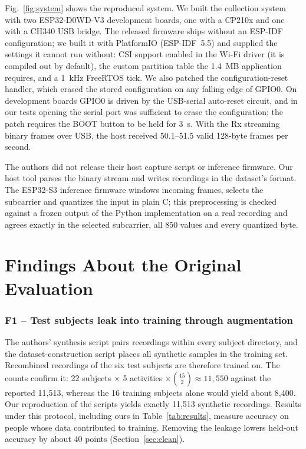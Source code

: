 \documentclass[journal]{IEEEtran}
\begin{document}
Fig.~\ref{fig:system} shows the reproduced system. We built the collection system with
two ESP32-D0WD-V3 development boards, one with a
CP210x and one with a CH340 USB bridge. The released firmware ships without an
ESP-IDF configuration; we built it with PlatformIO (ESP-IDF~5.5) and supplied the
settings it cannot run without: CSI support enabled in the Wi-Fi driver (it is
compiled out by default), the custom partition table the 1.4~MB application requires,
and a 1~kHz FreeRTOS tick. We also patched the configuration-reset handler, which
erased the stored configuration on any falling edge of GPIO0. On development boards
GPIO0 is driven by the USB-serial auto-reset circuit, and in our tests opening the
serial port was sufficient to erase the configuration; the patch requires the BOOT
button to be held for 3~s. With the Rx streaming binary frames over USB, the host
received 50.1--51.5 valid 128-byte frames per second.

The authors did not release their host capture script or inference firmware. Our
host tool parses the binary stream and writes recordings in the dataset's format.
The ESP32-S3 inference firmware windows incoming frames, selects the subcarrier and
quantizes the input in plain C; this preprocessing is checked against a frozen
output of the Python implementation on a real recording and agrees exactly in the
selected subcarrier, all 850 values and every quantized byte.

\section{Findings About the Original Evaluation}
\label{sec:findings}

\subsubsection*{F1 -- Test subjects leak into training through augmentation}
The authors' synthesis script pairs recordings within every subject directory, and
the dataset-construction script places all synthetic samples in the training set.
Recombined recordings of the six test subjects are therefore trained on. The counts
confirm it: 22 subjects $\times$ 5 activities $\times \binom{15}{2} \approx 11{,}550$
against the reported 11{,}513, whereas the 16 training subjects alone would yield
about 8{,}400. Our reproduction of the scripts yields exactly 11{,}513 synthetic
recordings. Results under this protocol, including ours in Table~\ref{tab:results},
measure accuracy on people whose data contributed to training. Removing the leakage
lowers held-out accuracy by about 40 points (Section~\ref{sec:clean}).
\end{document}
